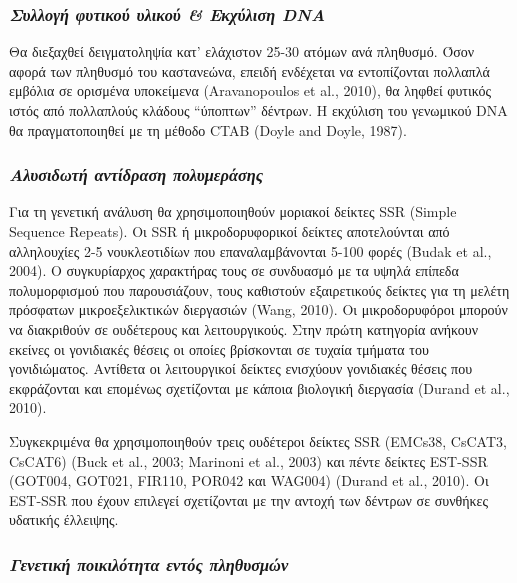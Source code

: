 \documentclass[12pt,a4paper,]{report}
\begin{document}
\hypertarget{----dna}{%
\subsubsection{\texorpdfstring{\emph{Συλλογή φυτικού υλικού \& Εκχύλιση
DNA}}{Συλλογή φυτικού υλικού \& Εκχύλιση DNA}}\label{----dna}}

Θα διεξαχθεί δειγματοληψία κατ' ελάχιστον 25-30 ατόμων ανά πληθυσμό.
Όσον αφορά των πληθυσμό του καστανεώνα, επειδή ενδέχεται να εντοπίζονται
πολλαπλά εμβόλια σε ορισμένα υποκείμενα (Aravanopoulos et al., 2010), θα
ληφθεί φυτικός ιστός από πολλαπλούς κλάδους ``ύποπτων'' δέντρων. Η
εκχύλιση του γενωμικού DNA θα πραγματοποιηθεί με τη μέθοδο CTAB (Doyle
and Doyle, 1987).

\hypertarget{--}{%
\subsubsection{\texorpdfstring{\emph{Αλυσιδωτή αντίδραση
πολυμεράσης}}{Αλυσιδωτή αντίδραση πολυμεράσης}}\label{--}}

Για τη γενετική ανάλυση θα χρησιμοποιηθούν μοριακοί δείκτες SSR (Simple
Sequence Repeats). Οι SSR ή μικροδορυφορικοί δείκτες αποτελούνται από
αλληλουχίες 2-5 νουκλεοτιδίων που επαναλαμβάνονται 5-100 φορές (Budak et
al., 2004). Ο συγκυρίαρχος χαρακτήρας τους σε συνδυασμό με τα υψηλά
επίπεδα πολυμορφισμού που παρουσιάζουν, τους καθιστούν εξαιρετικούς
δείκτες για τη μελέτη πρόσφατων μικροεξελικτικών διεργασιών (Wang,
2010). Οι μικροδορυφόροι μπορούν να διακριθούν σε ουδέτερους και
λειτουργικούς. Στην πρώτη κατηγορία ανήκουν εκείνες οι γονιδιακές θέσεις
οι οποίες βρίσκονται σε τυχαία τμήματα του γονιδιώματος. Αντίθετα οι
λειτουργικοί δείκτες ενισχύουν γονιδιακές θέσεις που εκφράζονται και
επομένως σχετίζονται με κάποια βιολογική διεργασία (Durand et al.,
2010).

Συγκεκριμένα θα χρησιμοποιηθούν τρεις ουδέτεροι δείκτες SSR (EMCs38,
CsCAT3, CsCAT6) (Buck et al., 2003; Marinoni et al., 2003) και πέντε
δείκτες EST-SSR (GOT004, GOT021, FIR110, POR042 και WAG004) (Durand et
al., 2010). Οι EST-SSR που έχουν επιλεγεί σχετίζονται με την αντοχή των
δέντρων σε συνθήκες υδατικής έλλειψης.

\hypertarget{---}{%
\subsubsection{\texorpdfstring{\emph{Γενετική ποικιλότητα εντός
πληθυσμών}}{Γενετική ποικιλότητα εντός πληθυσμών}}\label{---}}
\end{document}
